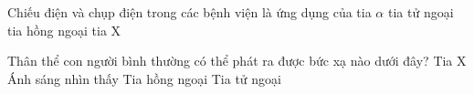 \begin{ex} 
 Chiếu điện và chụp điện trong các bệnh viện là ứng dụng của
\choice
{tia $\alpha$}
{tia tử ngoại}
{tia hồng ngoại}
{\True tia X}
\end{ex} 
\begin{ex}%
Thân thể con người bình thường có thể phát ra được bức xạ nào dưới đây?
\choice
{Tia X}
{Ánh sáng nhìn thấy}
{\True Tia hồng ngoại}
{Tia tử ngoại}
\end{ex} 















